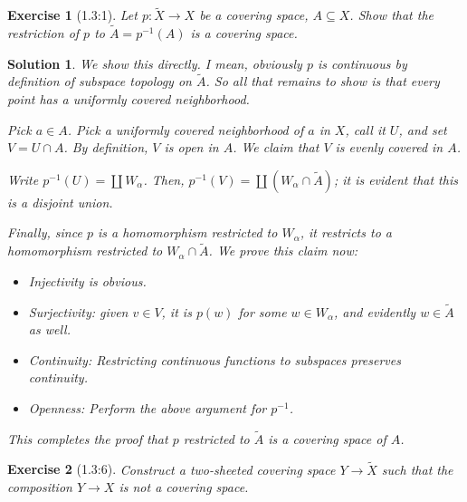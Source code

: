 \documentclass{article}
\theoremstyle{plain}
\newtheorem*{ex}{Exercise}
\theoremstyle{nonumberplain}
\newtheorem{sol}{Solution}
\begin{document}
\begin{ex}[1.3:1]
Let $p \colon \tilde X \to X$ be a covering space, $A \subseteq X$. Show that the restriction of $p$ to $\tilde A = p^{-1}(A)$ is a covering space.
\end{ex}

\begin{sol}
We show this directly. I mean, obviously $p$ is continuous by definition of subspace topology on $\tilde A$. So all that remains to show is that every point has a uniformly covered neighborhood.

Pick $a \in A$. Pick a uniformly covered neighborhood of $a$ in $X$, call it $U$, and set $V = U \cap A$. By definition, $V$ is open in $A$. We claim that $V$ is evenly covered in $A$.

Write $p^{-1}(U) = \coprod W_\alpha$. Then, $p^{-1}(V) = \coprod (W_\alpha \cap \tilde A)$; it is evident that this is a disjoint union.

Finally, since $p$ is a homomorphism restricted to $W_\alpha$, it restricts to a homomorphism restricted to $W_\alpha \cap \tilde A$. We prove this claim now:
\begin{itemize}
\item Injectivity is obvious.
\item Surjectivity: given $v \in V$, it is $p(w)$ for some $w \in W_\alpha$, and evidently $w \in \tilde A$ as well.
\item Continuity: Restricting continuous functions to subspaces preserves continuity.
\item Openness: Perform the above argument for $p^{-1}$.
\end{itemize}

This completes the proof that $p$ restricted to $\tilde A$ is a covering space of $A$.
\end{sol}

\begin{ex}[1.3:6]
Construct a two-sheeted covering space $Y \to \tilde X$ such that the composition $Y \to X$ is not a covering space.
\end{ex}
\end{document}
